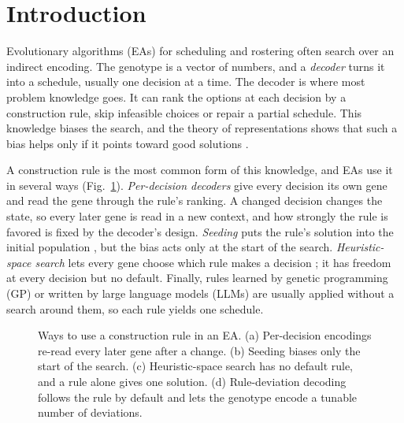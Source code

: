\section{Introduction}
\label{sec:intro}


Evolutionary algorithms (EAs) for scheduling and rostering often search over an indirect encoding.
The genotype is a vector of numbers, and a \emph{decoder} turns it into a schedule, usually one decision at a time.
The decoder is where most problem knowledge goes.
It can rank the options at each decision by a construction rule, skip infeasible choices or repair a partial schedule.
This knowledge biases the search, and the theory of representations shows that such a bias helps only if it points toward good solutions \cite{rothlauf2006representations}.

A construction rule is the most common form of this knowledge, and EAs use it in several ways (Fig.~\ref{fig:compare}).
\emph{Per-decision decoders} give every decision its own gene and read the gene through the rule's ranking.
A changed decision changes the state, so every later gene is read in a new context, and how strongly the rule is favored is fixed by the decoder's design.
\emph{Seeding} puts the rule's solution into the initial population \cite{shen2015dfjsp,zhang2011effective}, but the bias acts only at the start of the search.
\emph{Heuristic-space search} lets every gene choose which rule makes a decision \cite{storer1992new,dorndorf1995evolution}; it has freedom at every decision but no default.
Finally, rules learned by genetic programming (GP) or written by large language models (LLMs) \cite{zhang2026genetic,liu2024evolution} are usually applied without a search around them, so each rule yields one schedule.

\begin{figure}[t]
  \centering
  \caption{Ways to use a construction rule in an EA. (a) Per-decision encodings re-read every later gene after a change. (b) Seeding biases only the start of the search. (c) Heuristic-space search has no default rule, and a rule alone gives one solution. (d) Rule-deviation decoding follows the rule by default and lets the genotype encode a tunable number of deviations.}
  \label{fig:compare}
\end{figure}


